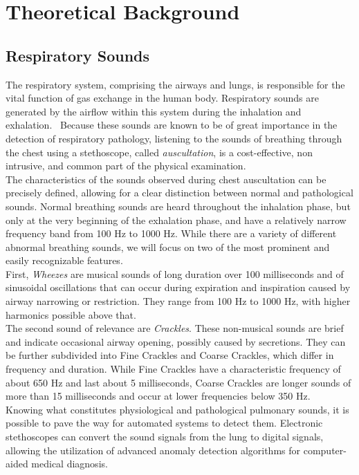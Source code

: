 \cleardoubleoddpage%
\chapter{Theoretical Background}

\section{Respiratory Sounds}
\label{theory:sounds}
The respiratory system, comprising the airways and lungs, is responsible for the vital function of gas exchange in the human body. Respiratory sounds are generated by the airflow within this system during the inhalation and exhalation.~\cite{earis1992lung} Because these sounds are known to be of great importance in the detection of respiratory pathology, listening to the sounds of breathing through the chest using a stethoscope, called \textit{auscultation}, is a cost-effective, non intrusive, and common part of the physical examination.~\cite{bohadana2014fundamentals} \\
The characteristics of the sounds observed during chest auscultation can be precisely defined, allowing for a clear distinction between normal and pathological sounds. Normal breathing sounds are heard throughout the inhalation phase, but only at the very beginning of the exhalation phase, and have a relatively narrow frequency band from 100 Hz to 1000 Hz. While there are a variety of different abnormal breathing sounds, we will focus on two of the most prominent and easily recognizable features.\\
First, \textit{Wheezes} are musical sounds of long duration over 100 milliseconds and of sinusoidal oscillations that can occur during expiration and inspiration caused by airway narrowing or restriction. They range from 100 Hz to 1000 Hz, with higher harmonics possible above that.\\
The second sound of relevance are \textit{Crackles}. These non-musical sounds are brief and indicate occasional airway opening, possibly caused by secretions. They can be further subdivided into Fine Crackles and Coarse Crackles, which differ in frequency and duration. While Fine Crackles have a characteristic frequency of about 650 Hz and last about 5 milliseconds, Coarse Crackles are longer sounds of more than 15 milliseconds and occur at lower frequencies below 350 Hz.~\cite{bohadana2014fundamentals} \\
Knowing what constitutes physiological and pathological pulmonary sounds, it is possible to pave the way for automated systems to detect them. Electronic stethoscopes can convert the sound signals from the lung to digital signals, allowing the utilization of advanced anomaly detection algorithms for computer-aided medical diagnosis.

